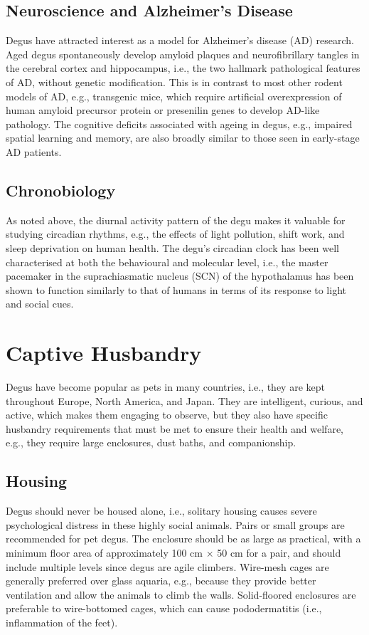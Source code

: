 \documentclass[12pt,a4paper]{article}
\begin{document}
\subsection{Neuroscience and Alzheimer's Disease}

Degus have attracted interest as a model for Alzheimer's disease (AD) research.
Aged degus spontaneously develop amyloid plaques and neurofibrillary tangles in the cerebral cortex and hippocampus, i.e., the two hallmark pathological features of AD, without genetic modification.
This is in contrast to most other rodent models of AD, e.g., transgenic mice, which require artificial overexpression of human amyloid precursor protein or presenilin genes to develop AD-like pathology.
The cognitive deficits associated with ageing in degus, e.g., impaired spatial learning and memory, are also broadly similar to those seen in early-stage AD patients.

\subsection{Chronobiology}

As noted above, the diurnal activity pattern of the degu makes it valuable for studying circadian rhythms, e.g., the effects of light pollution, shift work, and sleep deprivation on human health.
The degu's circadian clock has been well characterised at both the behavioural and molecular level, i.e., the master pacemaker in the suprachiasmatic nucleus (SCN) of the hypothalamus has been shown to function similarly to that of humans in terms of its response to light and social cues.

\section{Captive Husbandry}

Degus have become popular as pets in many countries, i.e., they are kept throughout Europe, North America, and Japan.
They are intelligent, curious, and active, which makes them engaging to observe, but they also have specific husbandry requirements that must be met to ensure their health and welfare, e.g., they require large enclosures, dust baths, and companionship.

\subsection{Housing}

Degus should never be housed alone, i.e., solitary housing causes severe psychological distress in these highly social animals.
Pairs or small groups are recommended for pet degus.
The enclosure should be as large as practical, with a minimum floor area of approximately 100 cm $\times$ 50 cm for a pair, and should include multiple levels since degus are agile climbers.
Wire-mesh cages are generally preferred over glass aquaria, e.g., because they provide better ventilation and allow the animals to climb the walls.
Solid-floored enclosures are preferable to wire-bottomed cages, which can cause pododermatitis (i.e., inflammation of the feet).
\end{document}

